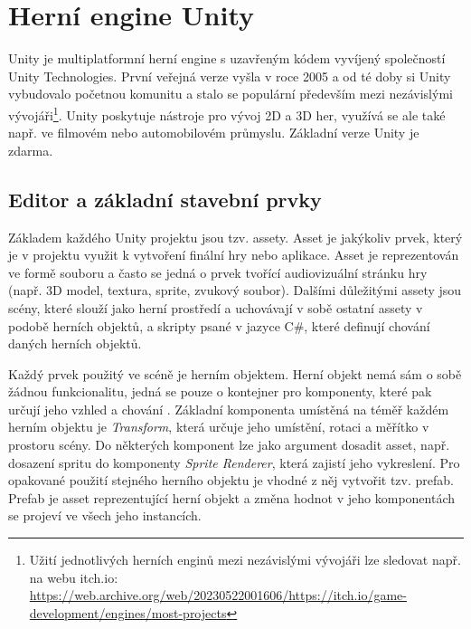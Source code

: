 \documentclass[FM,Proj]{tulthesis}
\begin{document}
	\chapter{Herní engine Unity}
	\label{chp2}
	
	Unity je multiplatformní herní engine s uzavřeným kódem vyvíjený společností Unity Technologies. První veřejná verze vyšla v roce 2005 a od té doby si Unity vybudovalo početnou komunitu a stalo se populární především mezi nezávislými vývojáři\footnote{Užití jednotlivých herních enginů mezi nezávislými vývojáři lze sledovat např. na webu itch.io: \url{https://web.archive.org/web/20230522001606/https://itch.io/game-development/engines/most-projects}}. Unity poskytuje nástroje pro vývoj 2D a 3D her, využívá se ale také např. ve filmovém nebo automobilovém průmyslu. Základní verze Unity je zdarma.
	
	\section{Editor a základní stavební prvky}
	
	Základem každého Unity projektu jsou tzv. assety. Asset je jakýkoliv prvek, který je v projektu využit k vytvoření finální hry nebo aplikace. Asset je reprezentován ve formě souboru a často se jedná o prvek tvořící audiovizuální stránku hry (např. 3D model, textura, sprite, zvukový soubor). Dalšími důležitými assety jsou scény, které slouží jako herní prostředí a uchovávají v sobě ostatní assety v podobě herních objektů, a skripty psané v jazyce C\#, které definují chování daných herních objektů.  \cite{UnityDocsAssetWorkflow}
	
	Každý prvek použitý ve scéně je herním objektem. Herní objekt nemá sám o sobě žádnou funkcionalitu, jedná se pouze o kontejner pro komponenty, které pak určují jeho vzhled a chování \cite{UnityDocsGameObject}. Základní komponenta umístěná na téměř každém herním objektu je \textit{Transform}, která určuje jeho umístění, rotaci a měřítko v prostoru scény. Do některých komponent lze jako argument dosadit asset, např. dosazení spritu do komponenty \textit{Sprite Renderer}, která zajistí jeho vykreslení. Pro opakované použití stejného herního objektu je vhodné z něj vytvořit tzv. prefab. Prefab je asset reprezentující herní objekt a změna hodnot v jeho komponentách se projeví ve všech jeho instancích.
	
\end{document}
